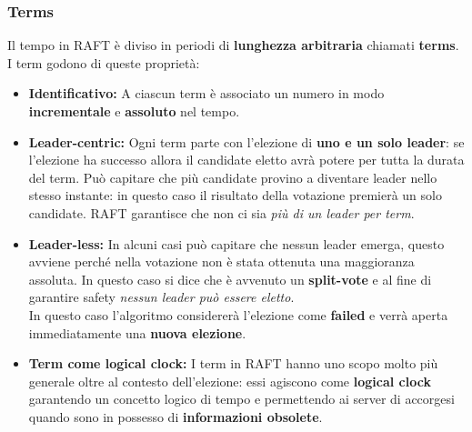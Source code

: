   \subsubsection{Terms}
  Il tempo in RAFT è diviso in periodi di \textbf{lunghezza arbitraria} chiamati \textbf{terms}. I term godono di queste proprietà:
  \begin{itemize}
    \item{\textbf{Identificativo:}}
    A ciascun term è associato un numero in modo \textbf{incrementale} e \textbf{assoluto} nel tempo.
    \item{\textbf{Leader-centric:}}
    Ogni term parte con l'elezione di \textbf{uno e un solo leader}: se l'elezione ha successo allora il candidate eletto avrà potere per tutta la durata del term. Può capitare che più candidate provino a diventare leader nello stesso instante: in questo caso il risultato della votazione premierà un solo candidate. RAFT garantisce che non ci sia \textit{più di un leader per term}.
    \item{\textbf{Leader-less:}}
    In alcuni casi può capitare che nessun leader emerga, questo avviene perché nella votazione non è stata ottenuta una maggioranza assoluta. In questo caso si dice che è avvenuto un \textbf{split-vote} e al fine di garantire safety \textit{nessun leader può essere eletto}.\\
    In questo caso l'algoritmo considererà l'elezione come \textbf{failed} e verrà aperta immediatamente una \textbf{nuova elezione}.
    \item{\textbf{Term come logical clock:}}
    I term in RAFT hanno uno scopo molto più generale oltre al contesto dell'elezione: essi agiscono come \textbf{logical clock} \cite{Lamport:1978} garantendo un concetto logico di tempo e permettendo ai server di accorgesi quando sono in possesso di \textbf{informazioni obsolete}.
  \end{itemize}
